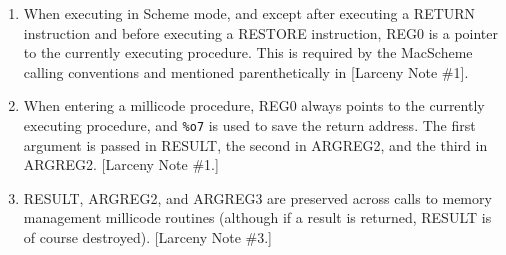 \begin{enumerate}
\item
When executing in Scheme mode, and except after executing a RETURN
instruction and before executing a RESTORE instruction, REG0 is a pointer to
the currently executing procedure. This is required by the MacScheme calling
conventions and mentioned parenthetically in [Larceny Note \#1].

\item
When entering a millicode procedure, REG0 always points to the currently
executing procedure, and {\tt \%o7} is used to save the return address.
The first argument is passed in RESULT, the second in ARGREG2, and the third
in ARGREG2. [Larceny Note \#1.]

\item
RESULT, ARGREG2, and ARGREG3 are preserved across calls to memory management
millicode routines (although if a result is returned, RESULT is of course
destroyed). [Larceny Note \#3.]

\end{enumerate}



